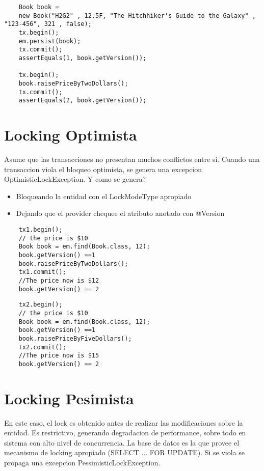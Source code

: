 \documentclass{article}
\begin{document}
  \begin{lstlisting}
    Book book = 
    new Book("H2G2" , 12.5F, "The Hitchhiker's Guide to the Galaxy" , "123-456", 321 , false);
    tx.begin();
    em.persist(book);
    tx.commit();
    assertEquals(1, book.getVersion());

    tx.begin();
    book.raisePriceByTwoDollars();
    tx.commit();
    assertEquals(2, book.getVersion());
\end{lstlisting}
\section*{Locking Optimista}
   Asume que las transacciones no presentan muchos conflictos entre si. Cuando una transaccion viola el bloqueo optimista, se genera una excepcion OptimisticLockException. Y como se genera? 
   
   \begin{itemize}
    \item Bloqueando la entidad con el LockModeType apropiado
    \item Dejando que el provider chequee el atributo anotado con @Version
   \end{itemize}

   \begin{lstlisting}
    tx1.begin();
    // the price is $10
    Book book = em.find(Book.class, 12);
    book.getVersion() ==1
    book.raisePriceByTwoDollars();
    tx1.commit();
    //The price now is $12
    book.getVersion() == 2
   \end{lstlisting}

   \begin{lstlisting}
    tx2.begin();
    // the price is $10
    Book book = em.find(Book.class, 12);
    book.getVersion() ==1
    book.raisePriceByFiveDollars();
    tx2.commit();
    //The price now is $15
    book.getVersion() == 2
   \end{lstlisting}
\section*{Locking Pesimista}
    En este caso, el lock es obtenido antes de realizar las modificaciones sobre la entidad. Es restrictivo, generando degradacion de performance, sobre todo en sistema con alto nivel de concurrencia.
    La base de datos es la que provee el mecanismo de locking apropiado (SELECT ... FOR UPDATE). Si se viola se propaga una excepcion PessimisticLockException.

\newpage
\end{document}
